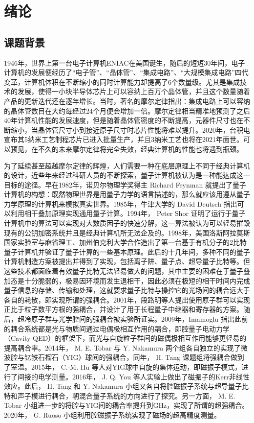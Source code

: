 
\chapter{绪论}
\label{ch1}

\section{课题背景}
1946年，世界上第一台电子计算机ENIAC在美国诞生，随后的短短30年间，电子计算机的发展便经历了“电子管”、“晶体管”、“集成电路”、“大规模集成电路”四代变革，计算机体积在不断缩小的同时计算能力却提高了6个数量级。尤其是集成技术的发展，使得一小块半导体芯片上可以容纳上百万个晶体管，并且这个数量随着产品的更新迭代还在逐年增长。当时，著名的摩尔定律指出：集成电路上可以容纳的晶体管数目在大约每经过24个月便会增加一倍。摩尔定律相当精准地预测了之后40年计算机性能的发展速度，但是随着晶体管密度的不断提高，元器件尺寸也在不断缩小，当晶体管尺寸小到接近原子尺寸时芯片性能将难以提升。2020年，台积电宣布其5纳米工艺制程芯片已进入批量生产，并且3纳米工艺也将在2021年面世。可以预见，在不久的未来摩尔定律将完全失效，经典计算机的性能也将遇到瓶颈。

为了延续甚至超越摩尔定律的辉煌，人们需要一种在底层原理上不同于经典计算机的设计，近些年来经过科研人员的不断探索，量子计算机被认为是一种能达成这一目标的途径。早在1982年，诺贝尔物理学奖得主 Richard Feynman 就提出了量子计算机的构想：既然物理世界是用量子力学的语言描述的，那么就应该用遵从量子力学原理的计算机来模拟真实世界。1985年，牛津大学的 David Deutsch 指出可以利用相干叠加原理实现通用量子计算。1994年， Peter Shor 证明了运行于量子计算机中的算法可以实现对大数质因子的快速分解，这一算法被认为可以轻易摧毁现有的公钥加密系统并且是经典计算机所无法企及的。1998年，美国洛斯阿拉莫斯国家实验室与麻省理工、加州伯克利大学合作造出了第一台基于有机分子的2比特量子计算机并验证了量子计算的一些基本原理。此后的十几年间，多种不同的量子计算机制造方案被提出并得到了实现，包括离子阱、量子点、超导量子比特等。但这些技术都面临着有效量子比特无法轻易做大的问题，其中主要的困难在于量子叠加态是十分脆弱的，极易因环境而发生退相干，因此必须在极短的相干时间内完成量子信息的存储、传输和处理，这就要求量子比特与操控它的光场间的耦合远大于各自的耗散，即实现所谓的强耦合。2001年，段路明等人提出使用原子群可以实现正比于粒子数平方根的强耦合，并设计了用于长程量子中继器和寄存器的方案。随后，超冷原子群与光学腔间的强耦合被实验所证实。2009年，Imamoglu 指出此前的耦合系统都是光与物质间通过电偶极相互作用的耦合，即腔量子电动力学（Cavity QED）的框架下，而光与自旋粒子群间的磁偶极相互作用能够更轻易的提高耦合率。2014年， M. E. Tobar 与 Y. Nakamura 两个组各自独立的实现了微波腔与钇铁石榴石（YIG）球间的强耦合，同年， H. Tang 课题组将强耦合做到了室温。2015年， C.-M. Hu 等人对YIG球中自旋的集体运动，即磁振子模式，进行了间接的电学测量。2016年， J. Q. You 等人实验上做出了磁振子的Kerr非线性效应。此后， H. Tang 和 Y. Nakamura 小组又各自将腔磁振子系统与超导量子比特和声子模进行耦合，朝混合量子系统的方向进行了探究。另一方面， M. E. Tobar 小组进一步的将腔与YIG间的耦合率提升到GHz，实现了所谓的超强耦合。2020年， G. Ruoso 小组利用腔磁振子系统实现了磁场的超高精度测量。

